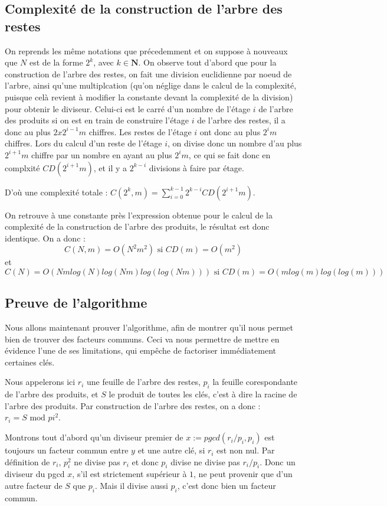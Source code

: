 \documentclass[a4paper,10pt]{article}
\begin{document}
  \subsection{Complexité de la construction de l'arbre des restes}
  On reprends les même notations que précedemment et on suppose à nouveaux que $N$ est de la forme $2^k$, avec $k\in\mathbf{N}$.
  On observe tout d'abord que pour la construction de l'arbre des restes, on fait une division euclidienne par noeud de l'arbre, ainsi qu'une multiplcation (qu'on néglige dans le calcul de la complexité, puisque celà revient à modifier la constante devant la complexité de la division) pour obtenir le diviseur. Celui-ci est le carré d'un nombre de l'étage $i$ de l'arbre des produits si on est en train de construire l'étage $i$ de l'arbre des restes, il a donc au plus $2x2^{i-1}m$ chiffres. Les restes de l'étage $i$ ont donc au plus $2^im$ chiffres.
  Lors du calcul d'un reste de l'étage $i$, on divise donc un nombre d'au plus $2^{i+1}m$ chiffre par un nombre en ayant au plus $2^im$, ce qui se fait donc en complxité $CD(2^{i+1}m)$, et il y a $2^{k-i}$ divisions à faire par étage.
  
  D'où une complexité totale : $C(2^k, m) = \sum_{i=0}^{k-1}2^{k-i}CD(2^{i+1}m)$.
  
  On retrouve à une constante près l'expression obtenue pour le calcul de la complexité de la construction de l'arbre des produits, le résultat est donc identique.
  On a donc :
  \[
   C(N,m) = O(N^2m^2) \text{ si } CD(m) = O(m^2)
  \]
  et
  \[
   C(N) = O(Nmlog(N)log(Nm)log(log(Nm))) \text{ si } CD(m) = O(mlog(m)log(log(m)))
  \]
  
  \subsection{Preuve de l'algorithme}
  Nous allons maintenant prouver l'algorithme, afin de montrer qu'il nous permet bien de trouver des facteurs communs.
  Ceci va nous permettre de mettre en évidence l'une de ses limitations, qui empêche de factoriser immédiatement certaines clés.
  
  Nous appelerons ici $r_i$ une feuille de l'arbre des restes, $p_i$ la feuille corespondante de l'arbre des produits, et $S$ le produit de toutes les clés, c'est à dire la racine de l'arbre des produits.
  Par construction de l'arbre des restes, on a donc : $r_i = S \text{ mod } pi^2$.
  
  Montrons tout d'abord qu'un diviseur premier de $x := pgcd(r_i/p_i,p_i)$ est toujours un facteur commun entre $y$ et une autre clé, si $r_i$ est non nul. Par définition de $r_i$, $p_i^2$ ne divise pas $r_i$ et donc $p_i$ divise ne divise pas $r_i/p_i$. Donc un diviseur du pgcd $x$, s'il est strictement supérieur à $1$, ne peut provenir que d'un autre facteur de $S$ que $p_i$. Mais il divise aussi $p_i$, c'est donc bien un facteur commun.
  
\end{document}

